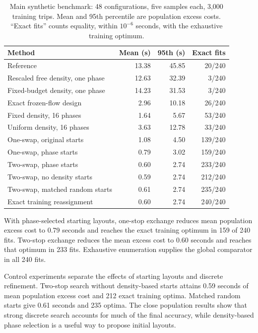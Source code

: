 \documentclass[11pt]{article}
\theoremstyle{remark}\newtheorem{remark}[theorem]{Remark}
\begin{document}
\begin{table}[htbp]\centering\small
\caption{Main synthetic benchmark: 48 configurations, five samples each, 3,000 training trips. Mean and 95th percentile are population excess costs. ``Exact fits'' counts equality, within $10^{-6}$ seconds, with the exhaustive training optimum.}\label{tab:suite}
\begin{tabular}{@{}p{3.25in}rrr@{}}\toprule
Method & Mean (s) & 95th (s) & Exact fits\\\midrule
Reference & 13.38 & 45.85 & 20/240 \\
Rescaled free density, one phase & 12.63 & 32.39 & 3/240 \\
Fixed-budget density, one phase & 14.23 & 31.53 & 3/240 \\
Exact frozen-flow design & 2.96 & 10.18 & 26/240 \\
Fixed density, 16 phases & 1.64 & 5.67 & 53/240 \\
Uniform density, 16 phases & 3.63 & 12.78 & 33/240 \\
One-swap, original starts & 1.08 & 4.50 & 139/240 \\
One-swap, phase starts & 0.79 & 3.02 & 159/240 \\
Two-swap, phase starts & 0.60 & 2.74 & 233/240 \\
Two-swap, no density starts & 0.59 & 2.74 & 212/240 \\
Two-swap, matched random starts & 0.61 & 2.74 & 235/240 \\
Exact training reassignment & 0.60 & 2.74 & 240/240 \\
\bottomrule\end{tabular}
\end{table}

With phase-selected starting layouts, one-stop exchange reduces mean population excess cost to 0.79 seconds and reaches the exact training optimum in 159 of 240 fits. Two-stop exchange reduces the mean excess cost to 0.60 seconds and reaches that optimum in 233 fits. Exhaustive enumeration supplies the global comparator in all 240 fits.

Control experiments separate the effects of starting layouts and discrete refinement. Two-stop search without density-based starts attains 0.59 seconds of mean population excess cost and 212 exact training optima. Matched random starts give 0.61 seconds and 235 optima. The close population results show that strong discrete search accounts for much of the final accuracy, while density-based phase selection is a useful way to propose initial layouts.
\end{document}
